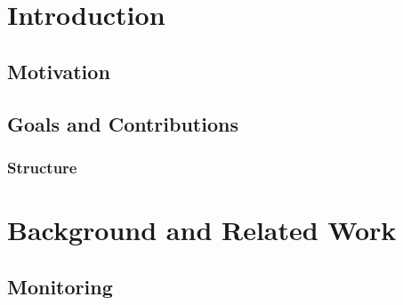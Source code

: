 \section{Introduction}
\subsection{Motivation}
\subsection{Goals and Contributions}
\subsubsection{Structure}
\section{Background and Related Work}
\subsection{Monitoring}
